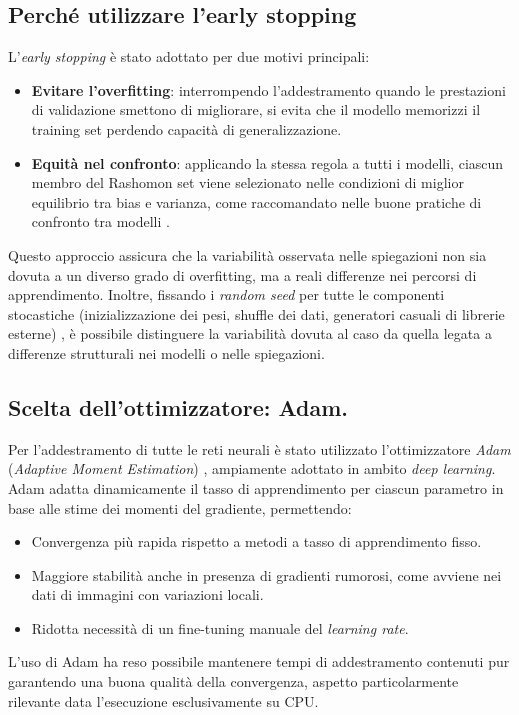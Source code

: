 \documentclass[12pt,a4paper,oneside]{report}
\numberwithin{figure}{chapter}
\numberwithin{table}{chapter}
\begin{document}
\subsection{Perché utilizzare l’early stopping}
L’\emph{early stopping} \citep{prechelt1998early} è stato adottato per due
motivi principali:
\begin{itemize}
      \item \textbf{Evitare l’overfitting}: interrompendo l’addestramento quando le prestazioni di validazione smettono di migliorare, si evita che il modello memorizzi il training set perdendo capacità di generalizzazione.
      \item \textbf{Equità nel confronto}: applicando la stessa regola a tutti i modelli, ciascun membro del Rashomon set viene selezionato nelle condizioni di miglior equilibrio tra bias e varianza, come raccomandato nelle buone pratiche di confronto tra modelli \citep{goodfellow2016deep}.
\end{itemize}

Questo approccio assicura che la variabilità osservata nelle spiegazioni non
sia dovuta a un diverso grado di overfitting, ma a reali differenze nei
percorsi di apprendimento. Inoltre, fissando i \emph{random seed} per tutte le
componenti stocastiche (inizializzazione dei pesi, shuffle dei dati, generatori
casuali di librerie esterne) \citep{reimers2017reporting}, è possibile
distinguere la variabilità dovuta al caso da quella legata a differenze
strutturali nei modelli o nelle spiegazioni.

\subsection{Scelta dell’ottimizzatore: Adam.}
Per l’addestramento di tutte le reti neurali è stato utilizzato l’ottimizzatore
\emph{Adam} (\emph{Adaptive Moment Estimation}) \citep{kingma2014adam},
ampiamente adottato in ambito \emph{deep learning}. Adam adatta dinamicamente
il tasso di apprendimento per ciascun parametro in base alle stime dei momenti
del gradiente, permettendo:
\begin{itemize}
      \item Convergenza più rapida rispetto a metodi a tasso di apprendimento fisso.
      \item Maggiore stabilità anche in presenza di gradienti rumorosi, come avviene nei
            dati di immagini con variazioni locali.
      \item Ridotta necessità di un fine-tuning manuale del \emph{learning rate}.
\end{itemize}
L’uso di Adam ha reso possibile mantenere tempi di addestramento contenuti pur garantendo
una buona qualità della convergenza, aspetto particolarmente rilevante data
l’esecuzione esclusivamente su CPU.
\end{document}
